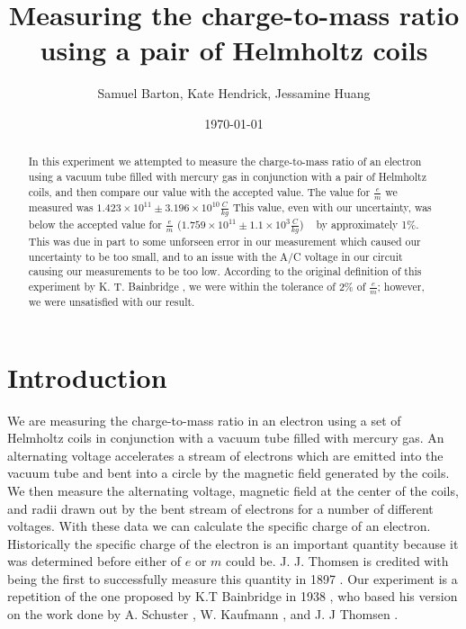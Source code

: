 \documentclass[aps,twocolumn,secnumarabic,amsmath,amssymb,nofootinbib]{revtex4-1}
\begin{document}
\title{Measuring the charge-to-mass ratio using a pair of Helmholtz coils}
\author{Samuel Barton, Kate Hendrick, Jessamine Huang}
\date{\today}

\begin{abstract}
In this experiment we attempted to measure the charge-to-mass ratio of an electron using a vacuum tube filled with mercury gas in conjunction with a pair of Helmholtz coils, and then compare our value with the accepted value. The value for $\frac{e}{m}$ we measured was $1.423\times10^{11} \pm 3.196\times10^{10} \frac{C}{kg}$ This value, even with our uncertainty, was below the accepted value for $\frac{e}{m}$ ($1.759\times10^{11} \pm 1.1\times10^3 \frac{C}{kg}$) ~\cite{value} by approximately 1\%. This was due in part to some unforseen error in our measurement which caused our uncertainty to be too small, and to an issue with the A/C voltage in our circuit causing our measurements to be too low. According to the original definition of this experiment by K. T. Bainbridge \cite{origin}, we were within the tolerance of 2\% of $\frac{e}{m}$; however, we were unsatisfied with our result.
\linebreak
\end{abstract}

\maketitle

%
%
\section{Introduction}

We are measuring the charge-to-mass ratio in an electron using a set of Helmholtz coils in conjunction with a vacuum tube filled with mercury gas. An alternating voltage accelerates a stream of electrons which are emitted into the vacuum tube and bent into a circle by the magnetic field generated by the coils. We then measure the alternating voltage, magnetic field at the center of the coils, and radii drawn out by the bent stream of electrons for a number of different voltages. With these data we can calculate the specific charge of an electron. Historically the specific charge of the electron is an important quantity because it was determined before either of $e$ or $m$ could be. J. J. Thomsen is credited with being the first to successfully measure this quantity in 1897 \cite{first_measurement}. Our experiment is a repetition of the one proposed by K.T Bainbridge in 1938 \cite{origin}, who based his version on the work done by A. Schuster \cite{schuster}, W. Kaufmann \cite{kaufmann}, and J. J Thomsen \cite{thomsen}.
\end{document}
